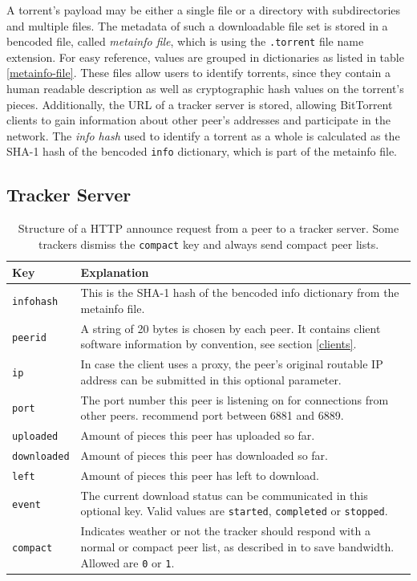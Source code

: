 \documentclass[10pt, a4paper, twoside, headsepline]{scrbook}
\renewcommand{\_}{\origunderscore\allowbreak}
\begin{document}
A torrent's payload may be either a single file or a directory with subdirectories and multiple files. The metadata of such a downloadable file set is stored in a bencoded file, called \emph{metainfo file}, which is using the \texttt{.torrent} file name extension. For easy reference, values are grouped in dictionaries as listed in table \ref{metainfo-file}. These files allow users to identify torrents, since they contain a human readable description as well as cryptographic hash values on the torrent's pieces. Additionally, the URL of a tracker server is stored, allowing BitTorrent clients to gain information about other peer's addresses and participate in the network. The \emph{info hash} used to identify a torrent as a whole is calculated as the SHA-1 hash of the bencoded \texttt{info} dictionary, which is part of the metainfo file.

\subsection{Tracker Server}
\begin{table}
\centering
\begin{tabularx}{\textwidth}{lX}
\toprule
Key & Explanation \\
\midrule
\texttt{info\_hash} & This is the SHA-1 hash of the bencoded info dictionary from the metainfo file. \\
\texttt{peer\_id} & A string of 20 bytes is chosen by each peer. It contains client software information by convention, see section \ref{clients}. \\
\texttt{ip} & In case the client uses a proxy, the peer's original routable IP address can be submitted in this optional parameter. \\
\texttt{port} & The port number this peer is listening on for connections from other peers. \cite{bep3} recommend port between 6881 and 6889. \\
\texttt{uploaded} & Amount of pieces this peer has uploaded so far. \\
\texttt{downloaded} & Amount of pieces this peer has downloaded so far. \\
\texttt{left} & Amount of pieces this peer has left to download. \\
\texttt{event} & The current download status can be communicated in this optional key. Valid values are \texttt{started}, \texttt{completed} or \texttt{stopped}. \\
\texttt{compact} & Indicates weather or not the tracker should respond with a normal or compact peer list, as described in \cite{bep23} to save bandwidth. Allowed are \texttt{0} or \texttt{1}. \\
\bottomrule
\end{tabularx}
\caption[Structure of a HTTP announce request]{Structure of a HTTP announce request from a peer to a tracker server. Some trackers dismiss the \texttt{compact} key and always send compact peer lists.}
\label{announce}
\end{table}
\end{document}

